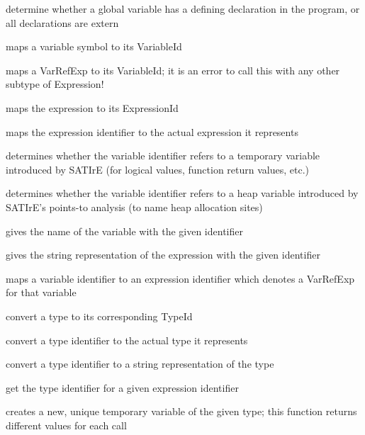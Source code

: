 \documentclass[a4paper,12pt]{report}
\begin{document}
\begin{description}
    determine whether a global variable has a defining declaration in the
    program, or all declarations are extern

    maps a variable symbol to its VariableId

    maps a VarRefExp to its VariableId; it is an error to call this with any
    other subtype of Expression!

    maps the expression to its ExpressionId

    maps the expression identifier to the actual expression it represents

    determines whether the variable identifier refers to a temporary
    variable introduced by SATIrE (for logical values, function return
    values, etc.)

    determines whether the variable identifier refers to a heap variable
    introduced by SATIrE's points-to analysis (to name heap allocation
    sites)

    gives the name of the variable with the given identifier

    gives the string representation of the expression with the given
    identifier

    maps a variable identifier to an expression identifier which denotes a
    VarRefExp for that variable

    convert a type to its corresponding TypeId

    convert a type identifier to the actual type it represents

    convert a type identifier to a string representation of the type

    get the type identifier for a given expression identifier

    creates a new, unique temporary variable of the given type; this
    function returns different values for each call


\end{description}
\end{document}
